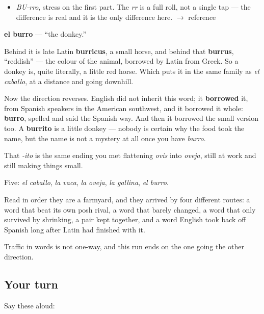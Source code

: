 \begin{sounds}
\begin{itemize}
\raggedright
  \item \emph{BU-rro}, stress on the first part. The \emph{rr} is a full roll, not a single tap — the difference is real and it is the only difference here. $\to$ reference
\end{itemize}
\end{sounds}

\begin{cousinweb}
\textbf{el burro} — \textquotedblleft{}the donkey.\textquotedblright{}

Behind it is late Latin \textbf{burricus}, a small horse, and behind that \textbf{burrus}, \textquotedblleft{}reddish\textquotedblright{} — the colour of the animal, borrowed by Latin from Greek. So a donkey is, quite literally, a little red horse. Which puts it in the same family as \emph{el caballo}, at a distance and going downhill.

Now the direction reverses. English did not inherit this word; it \textbf{borrowed} it, from Spanish speakers in the American southwest, and it borrowed it whole: \textbf{burro}, spelled and said the Spanish way. And then it borrowed the small version too. A \textbf{burrito} is a little donkey — nobody is certain why the food took the name, but the name is not a mystery at all once you have \emph{burro}.

That \emph{-ito} is the same ending you met flattening \emph{ovis} into \emph{oveja}, still at work and still making things small.
\end{cousinweb}

\begin{grammarlens}[title={What you've built}]
Five: \emph{el caballo}, \emph{la vaca}, \emph{la oveja}, \emph{la gallina}, \emph{el burro}.

Read in order they are a farmyard, and they arrived by four different routes: a word that beat its own posh rival, a word that barely changed, a word that only survived by shrinking, a pair kept together, and a word English took back off Spanish long after Latin had finished with it.

Traffic in words is not one-way, and this run ends on the one going the other direction.
\end{grammarlens}

\subsection*{Your turn}
Say these aloud:

